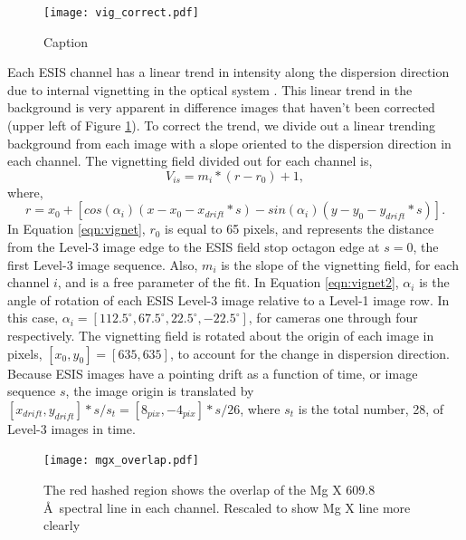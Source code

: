  		\begin{figure}[htb!]
			\centering
			\texttt{[image: vig\_correct.pdf]}
			\caption{Caption}
			\label{fig:vig_correct}
		\end{figure}
	       	
        Each ESIS channel has a linear trend in intensity along the dispersion direction due to internal vignetting in the optical system \citep{ESIS}.
        This linear trend in the background is very apparent in difference images that haven't been corrected (upper left of Figure \ref{fig:vig_correct}).
        To correct the trend, we divide out a linear trending background from each image with a slope oriented to the dispersion direction in each channel.
        The vignetting field divided out for each channel is,
        \begin{equation}
            V_{is} = m_{i} * (r - r_0) + 1,
            \label{eqn:vignet}
        \end{equation}
       	where,
       	\begin{equation}
        	r = x_0 + [cos(\alpha_i)(x-x_0-x_{drift}*s) - sin(\alpha_i)(y-y_0-y_{drift}*s)].
        	\label{eqn:vignet2}
       	\end{equation}
       	In Equation \ref{eqn:vignet}, $r_0$ is equal to 65 pixels, and represents the distance from the Level-3 image edge to the ESIS field stop octagon edge at $s = 0$, the first Level-3 image sequence.
       	Also, $m_{i}$ is the slope of the vignetting field, for each channel $i$, and is a free parameter of the fit.
        In Equation \ref{eqn:vignet2},  $\alpha_i$ is the angle of rotation of each ESIS Level-3 image relative to a Level-1 image row.
        In this case, $\alpha_i = [112.5^{\circ}, 67.5^{\circ}, 22.5^{\circ}, -22.5^{\circ}]$, for cameras one through four respectively.
        The vignetting field is rotated about the origin of each image in pixels, $[x_0, y_0] = [635,635]$, to account for the change in dispersion direction.
        Because ESIS images have a pointing drift as a function of time, or image sequence $s$, the image origin is translated by $[x_{drift},y_{drift}]*s/s_t = [8_{pix},-4_{pix}]*s/26$, where $s_t $ is the total number, 28, of Level-3 images in time.
        
        \begin{figure}[htb!]
        	\centering
        	\texttt{[image: mgx\_overlap.pdf]}
        	\caption{The red hashed region shows the overlap of the Mg X 609.8 \AA \ spectral line in each channel. Rescaled to show Mg X line more clearly}
        	\label{fig:mgx_overlap}
        \end{figure}
        
